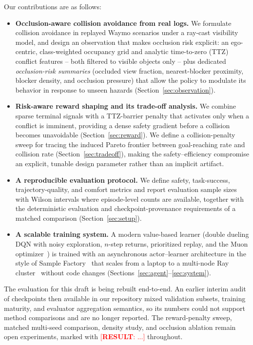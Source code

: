 \documentclass{article}
\newcommand{\results}[1]{\textcolor{red}{[\textbf{RESULT}: #1]}}
\begin{document}
Our contributions are as follows:
\begin{itemize}
  \item \textbf{Occlusion-aware collision avoidance from real logs.} We
  formulate collision avoidance in replayed Waymo scenarios under a
  ray-cast visibility model, and design an observation that makes occlusion
  risk explicit: an ego-centric, class-weighted occupancy grid and analytic
  time-to-zero (TTZ) conflict features -- both filtered to visible objects
  only -- plus dedicated \emph{occlusion-risk summaries} (occluded view
  fraction, nearest-blocker proximity, blocker density, and occlusion
  pressure) that allow the policy to modulate its behavior in response to
  unseen hazards (Section~\ref{sec:observation}).
  \item \textbf{Risk-aware reward shaping and its trade-off analysis.} We
  combine sparse terminal signals with a TTZ-barrier penalty that activates
  only when a conflict is imminent, providing a dense safety gradient before
  a collision becomes unavoidable (Section~\ref{sec:reward}). We define a
  collision-penalty sweep for tracing the induced Pareto frontier between
  goal-reaching rate and collision rate (Section~\ref{sec:tradeoff}), making
  the safety--efficiency compromise an explicit, tunable design parameter
  rather than an implicit artifact.
  \item \textbf{A reproducible evaluation protocol.} We define safety,
  task-success, trajectory-quality, and comfort metrics and report
  evaluation sample sizes with Wilson intervals where episode-level
  counts are available, together with the deterministic evaluation and
  checkpoint-provenance requirements of a matched comparison
  (Section~\ref{sec:setup}).
  \item \textbf{A scalable training system.} A modern value-based learner
  (double dueling DQN with noisy exploration, $n$-step returns, prioritized
  replay, and the Muon optimizer~\citep{jordan2024muon}) is trained with an
  asynchronous actor--learner architecture in the style of Sample
  Factory~\citep{petrenko2020sample} that scales from a laptop to a
  multi-node Ray cluster~\citep{moritz2018ray} without code changes
  (Sections~\ref{sec:agent}--\ref{sec:system}).
\end{itemize}

The evaluation for this draft is being rebuilt end-to-end. An earlier
interim audit of checkpoints then available in our repository mixed
validation subsets, training maturity, and evaluator aggregation
semantics, so its numbers could not support method comparisons and are no
longer reported. The reward-penalty sweep, matched multi-seed comparison,
density study, and occlusion ablation remain open experiments, marked with
\results{...} throughout.
\end{document}
